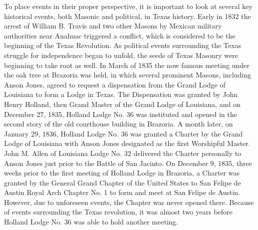 \documentclass[letterpaper]{article}
\begin{document}
To place events in their proper perspective, it is important to look at several key historical events,
both Masonic and political, in Texas history. Early in 1832 the arrest of William B. Travis and two
other Masons by Mexican military authorities near Anahuac triggered a conflict, which is considered
to be the beginning of the Texas Revolution. As political events surrounding the Texas struggle for
independence began to unfold, the seeds of Texas Masonry were beginning to take root as well. In
March of 1835 the now famous meeting under the oak tree at Brazoria was held, in which several
prominent Masons, including Anson Jones, agreed to request a dispensation from the Grand Lodge
of Louisiana to form a Lodge in Texas. The Dispensation was granted by John Henry Holland, then Grand Master of the Grand Lodge of Louisiana, and on December 27, 1835, Holland Lodge No. 36 was instituted and opened in the second story of the old courthouse building in Brazoria.
A month later, on January 29, 1836, Holland Lodge No. 36 was granted a Charter by the Grand
Lodge of Louisiana with Anson Jones designated as the first Worshipful Master. John M. Allen of
Louisiana Lodge No. 32 delivered the Charter personally to Anson Jones just prior to the Battle
of San Jacinto. On December 9, 1835, three weeks prior to the first meeting of Holland Lodge in
Brazoria, a Charter was granted by the General Grand Chapter of the United States to San Felipe
de Austin Royal Arch Chapter No. 1 to form and meet at San Felipe de Austin. However, due to
unforeseen events, the Chapter was never opened there. Because of events surrounding the Texas
revolution, it was almost two years before Holland Lodge No. 36 was able to hold another meeting.
\end{document}
